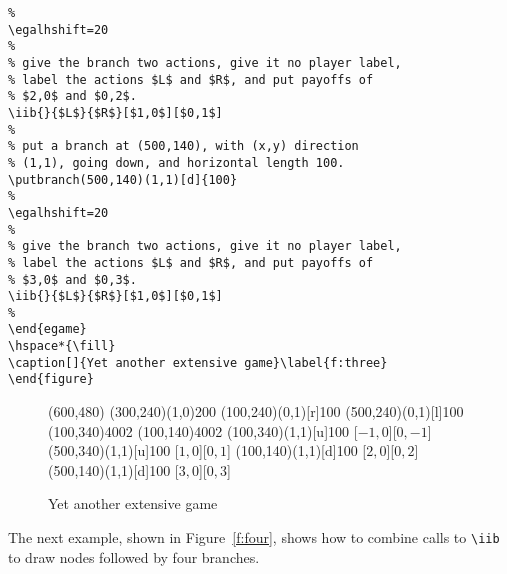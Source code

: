 \documentclass[12pt]{article}
\begin{document}
\begin{verbatim}
%
\egalhshift=20
%
% give the branch two actions, give it no player label,
% label the actions $L$ and $R$, and put payoffs of
% $2,0$ and $0,2$.
\iib{}{$L$}{$R$}[$1,0$][$0,1$]
%
% put a branch at (500,140), with (x,y) direction
% (1,1), going down, and horizontal length 100.
\putbranch(500,140)(1,1)[d]{100}
%
\egalhshift=20
%
% give the branch two actions, give it no player label,
% label the actions $L$ and $R$, and put payoffs of
% $3,0$ and $0,3$.
\iib{}{$L$}{$R$}[$1,0$][$0,1$]
%
\end{egame}
\hspace*{\fill}
\caption[]{Yet another extensive game}\label{f:three}
\end{figure}
\end{verbatim}

\begin{figure}[htb]
\hspace*{\fill}
\egpayoffboxsep=0mm
\begin{egame}(600,480)
\putbranch(300,240)(1,0){200}
\putbranch(100,240)(0,1)[r]{100}
\putbranch(500,240)(0,1)[l]{100}
\infoset(100,340){400}{2}
\infoset(100,140){400}{2}
\putbranch(100,340)(1,1)[u]{100}
[$-1,0$][$0,-1$]
\putbranch(500,340)(1,1)[u]{100}
[$1,0$][$0,1$]
\putbranch(100,140)(1,1)[d]{100}
[$2,0$][$0,2$]
\putbranch(500,140)(1,1)[d]{100}
[$3,0$][$0,3$]
\end{egame}
\hspace*{\fill}
\caption[]{Yet another extensive game}\label{f:three}
\end{figure}

The next example, shown in Figure~\ref{f:four}, shows how to combine calls to
\verb+\iib+ to draw nodes followed by four branches.
\end{document}
